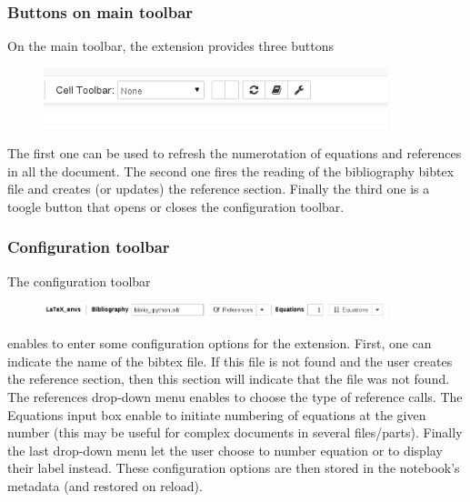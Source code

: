     \subsubsection{Buttons on main toolbar}\label{buttons-on-main-toolbar}

    On the main toolbar, the extension provides three buttons

\begin{figure}[H]
\centerline{\includegraphics[width=10cm]{main_toolbar.png}}
\end{figure}

The first one can be used to refresh the numerotation of equations and
references in all the document. The second one fires the reading of the
bibliography bibtex file and creates (or updates) the reference section.
Finally the third one is a toogle button that opens or closes the
configuration toolbar.

    \subsubsection{Configuration toolbar}\label{configuration-toolbar}

    The configuration toolbar\\

\begin{figure}[H]
\centerline{\includegraphics[width=10cm]{configuration_toolbar.png}}
\end{figure}

enables to enter some configuration options for the extension. First,
one can indicate the name of the bibtex file. If this file is not found
and the user creates the reference section, then this section will
indicate that the file was not found. The references drop-down menu
enables to choose the type of reference calls. The Equations input box
enable to initiate numbering of equations at the given number (this may
be useful for complex documents in several files/parts). Finally the
last drop-down menu let the user choose to number equation or to display
their label instead. These configuration options are then stored in the
notebook's metadata (and restored on reload).


